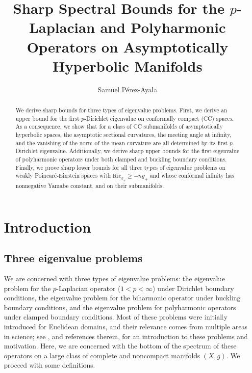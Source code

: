 \documentclass{amsart}
\newcommand{\Ric}{\text{Ric}}
\begin{document}
\title[Eigenvalue Estimates on AH Manifolds]{Sharp Spectral Bounds for the $p$-Laplacian and Polyharmonic Operators on Asymptotically Hyperbolic Manifolds}
\author{Samuel P\'erez-Ayala}
\address{Samuel P\'erez-Ayala\\370 Lancaster Ave \\Haverford College  \\ Haverford\\PA 19041\\ USA}


\subjclass[2020]{}
\begin{abstract}
We derive sharp bounds for three types of eigenvalue problems. First, we derive an upper bound for the first $p$-Dirichlet eigenvalue on conformally compact (CC) spaces. As a consequence, we show that for a class of CC submanifolds of asymptotically hyperbolic spaces, the asymptotic sectional curvatures, the meeting angle at infinity, and the vanishing of the norm of the mean curvature are all determined by its first $p$-Dirichlet eigenvalue. Additionally, we derive sharp upper bounds for the first eigenvalue of polyharmonic operators under both clamped and buckling boundary conditions. Finally, we prove sharp lower bounds for all three types of eigenvalue problems on weakly Poincar\'e-Einstein spaces with $\Ric_{g_+}\ge -ng_+$ and whose conformal infinity has nonnegative Yamabe constant, and on their submanifolds. 
\end{abstract}

\maketitle

\setcounter{tocdepth}{3}
\makeatletter
\renewcommand{\l@section}{\@tocline{1}{0pt}{0pt}{}{}}
\renewcommand{\l@subsection}{\@tocline{2}{0pt}{1.5em}{}{}}
\renewcommand{\l@subsubsection}{\@tocline{3}{0pt}{3em}{}{}}
\makeatother
\tableofcontents
\section{Introduction}
\subsection{Three eigenvalue problems} We are concerned with three types of eigenvalue problems: the eigenvalue problem for the $p$-Laplacian operator ($1<p<\infty$) under Dirichlet boundary conditions, the eigenvalue problem for the biharmonic operator under buckling boundary conditions, and the eigenvalue problem for polyharmonic operators under clamped boundary conditions. Most of these problems were initially introduced for Euclidean domains, and their relevance comes from multiple areas in science; see \cite{Ashbaugh1999}, and references therein, for an introduction to these problems and motivation. Here, we are concerned with the bottom of the spectrum of these operators on a large class of complete and noncompact manifolds $(X,g)$. We proceed with some definitions.
\end{document}
